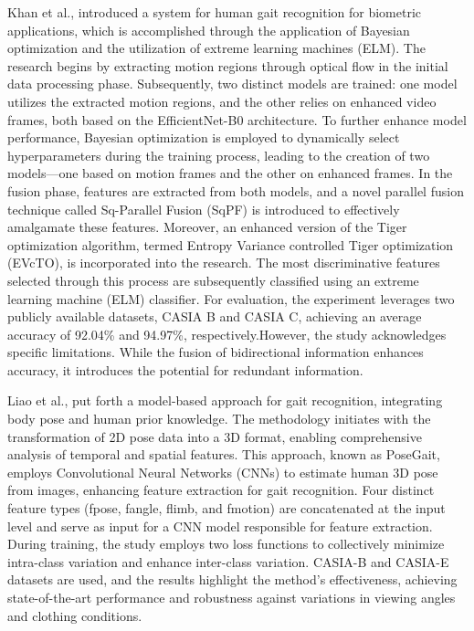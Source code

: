 \documentclass[12pt,a4paper]{article}
\begin{document}
Khan et al.\cite{khan2023}, introduced a system for human gait recognition for biometric applications, which is accomplished through the application of Bayesian optimization and the utilization of extreme learning machines (ELM). The research begins by extracting motion regions through optical flow in the initial data processing phase. Subsequently, two distinct models are trained: one model utilizes the extracted motion regions, and the other relies on enhanced video frames, both based on the EfficientNet-B0 architecture. To further enhance model performance, Bayesian optimization is employed to dynamically select hyperparameters during the training process, leading to the creation of two models—one based on motion frames and the other on enhanced frames. In the fusion phase, features are extracted from both models, and a novel parallel fusion technique called Sq-Parallel Fusion (SqPF) is introduced to effectively amalgamate these features. Moreover, an enhanced version of the Tiger optimization algorithm, termed Entropy Variance controlled Tiger optimization (EVcTO), is incorporated into the research. The most discriminative features selected through this process are subsequently classified using an extreme learning machine (ELM) classifier. For evaluation, the experiment leverages two publicly available datasets, CASIA B and CASIA C, achieving an average accuracy of 92.04\% and 94.97\%, respectively.However, the study acknowledges specific limitations. While the fusion of bidirectional information enhances accuracy, it introduces the potential for redundant information. 

Liao et al.\cite{liao2020}, put forth a model-based approach for gait recognition, integrating body pose and human prior knowledge. The methodology initiates with the transformation of 2D pose data into a 3D format, enabling comprehensive analysis of temporal and spatial features. This approach, known as PoseGait, employs Convolutional Neural Networks (CNNs) to estimate human 3D pose from images, enhancing feature extraction for gait recognition. Four distinct feature types (fpose, fangle, flimb, and fmotion) are concatenated at the input level and serve as input for a CNN model responsible for feature extraction. During training, the study employs two loss functions to collectively minimize intra-class variation and enhance inter-class variation. CASIA-B and CASIA-E datasets are used, and the results highlight the method's effectiveness, achieving state-of-the-art performance and robustness against variations in viewing angles and clothing conditions.
\end{document}
